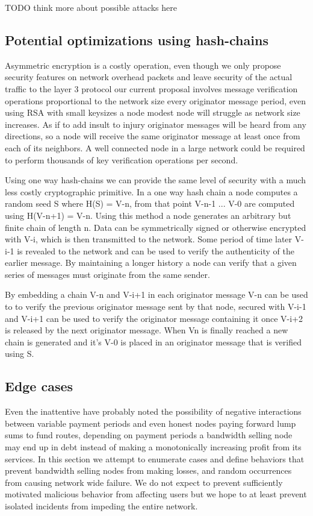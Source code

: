 \documentclass[11pt]{article}
\begin{document}
               TODO think more about possible attacks here
    
    \subsection{Potential optimizations using hash-chains}
    
               Asymmetric encryption is a costly operation, even though we only propose security features on network overhead packets and leave security of the actual traffic to the layer 3 protocol our current proposal involves message verification operations proportional to the network size every originator message period, even using RSA with small keysizes a node modest node will struggle as network size increases. As if to add insult to injury originator messages will be heard from any directions, so a node will receive the same originator message at least once from each of its neighbors. A well connected node in a large network could be required to perform thousands of key verification operations per second.
               
               Using one way hash-chains we can provide the same level of security with a much less costly cryptographic primitive. In a one way hash chain a node computes a random seed S where H(S) = V-n, from that point V-n-1 ... V-0 are computed using H(V-n+1) = V-n. Using this method a node generates an arbitrary but finite chain of length n. Data can be symmetrically signed or otherwise encrypted with V-i, which is then transmitted to the network. Some period of time later V-i-1 is revealed to the network and can be used to verify the authenticity of the earlier message. By maintaining a longer history a node can verify that a given series of messages must originate from the same sender.
               
               By embedding a chain V-n and V-i+1 in each originator message V-n can be used to to verify the previous originator message sent by that node, secured with V-i-1 and V-i+1 can be used to verify the originator message containing it once V-i+2 is released by the next originator message. When Vn is finally reached a new chain is generated and it's V-0 is placed in an originator message that is verified using S.           

	\subsection{Edge cases}
               Even the inattentive have probably noted the possibility of negative interactions between variable payment periods and even honest nodes paying forward lump sums to fund routes, depending on payment periods a bandwidth selling node may end up in debt instead of making a monotonically increasing profit from its services. In this section we attempt to enumerate cases and define behaviors that prevent bandwidth selling nodes from making losses, and random occurrences from causing network wide failure. We do not expect to prevent sufficiently motivated malicious behavior from affecting users but we hope to at least prevent isolated incidents from impeding the entire network.
\end{document}
